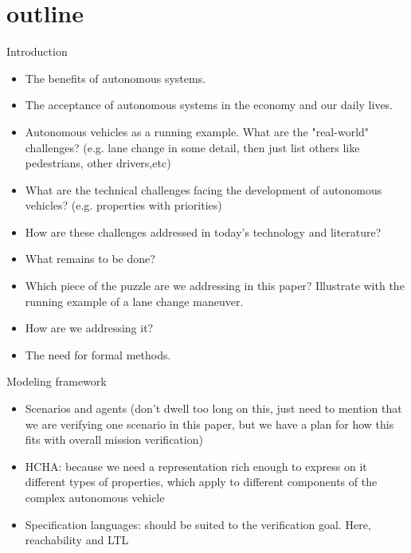\section{outline}
\label{outline}
Introduction
\begin{itemize}
	\item The benefits of autonomous systems.
	
	\item The acceptance of autonomous systems in the economy and our daily lives.
	
	\item Autonomous vehicles as a running example. What are the "real-world" challenges? (e.g. lane change in some detail, then just list others like pedestrians, other drivers,etc)
	
	\item What are the technical challenges facing the development of autonomous vehicles? (e.g. properties with priorities)
	
	\item How are these challenges addressed in today's technology and literature?
	
	\item What remains to be done?
	
	\item Which piece of the puzzle are we addressing in this paper? Illustrate with the running example of a lane change maneuver.
	
	\item How are we addressing it?
	
	\item The need for formal methods.
\end{itemize}



Modeling framework
\begin{itemize}
	\item Scenarios and agents (don't dwell too long on this, just need to mention that we are verifying one scenario in this paper, but we have a plan for how this fits with overall mission verification)
	
	\item HCHA: because we need a representation rich enough to express on it different types of properties, which apply to different components of the complex autonomous vehicle
	
	\item Specification languages: should be suited to the verification goal. Here, reachability and LTL

\end{itemize}

